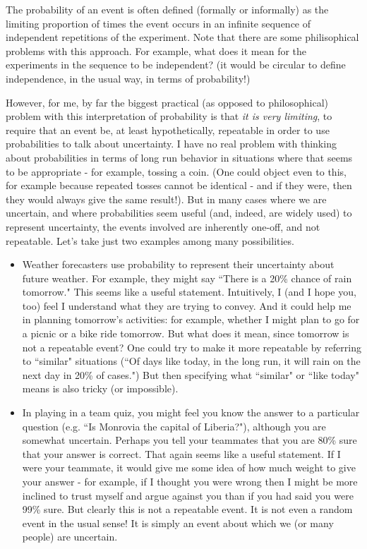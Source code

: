 \documentclass{article}[11pt]
\begin{document}
The probability of an event is often defined (formally or informally)
as the limiting proportion of times the event occurs in an infinite
sequence of independent repetitions of the experiment. Note that there are some philisophical problems with this approach. For example, what does it mean for the experiments in the sequence to be
  independent? (it would be circular to define independence, in the
  usual way, in terms of probability!)

However, for me, by far the biggest practical (as opposed to philosophical) problem with
this interpretation of probability is that {\it it is very limiting}, to require that an event be, at least  hypothetically, repeatable in order to use probabilities to talk about uncertainty. I have no
real problem with thinking about probabilities
in terms of long run behavior in situations where that seems to be appropriate - for example, tossing a coin. (One could object even to this, for example because repeated tosses cannot be identical - and if they were, then they would always give the same result!). But in many cases where we are uncertain, and where probabilities seem useful (and, indeed, are widely used) to represent uncertainty, the events involved are inherently one-off, and not repeatable.
Let's take just two examples among many possibilities.
\begin{itemize}
\item Weather forecasters use probability to represent their uncertainty about future weather. For example, they might say ``There is a 20\% chance of rain tomorrow." This seems like a useful statement. Intuitively, I (and I hope you, too) feel I understand what they are trying to convey.  And it could help me in planning
tomorrow's activities:  for example, whether
I might plan to go for a picnic or a bike ride tomorrow. But what does it mean, since tomorrow
is not a repeatable event? One could try to 
make it more repeatable by referring to  ``similar" situations (``Of days like today, in the long run, it will rain on the next day in 20\% of cases.") But then specifying what ``similar" or ``like today" means is also tricky (or impossible).
\item In playing in a team quiz, you might feel you know the answer to a particular question (e.g. ``Is Monrovia the capital of Liberia?"), although you
are somewhat uncertain. Perhaps you tell your teammates that you are 80\% sure that your answer is correct. That again seems like a useful statement. If I were your teammate, it would give me some idea of how much weight to give your
answer - for example, if I thought you were wrong then I might be more inclined to trust myself and argue against you than if you had said you were 99\% sure. But clearly this is not a repeatable event. It is not even a random event in the usual sense! It is simply an event about which we (or many people) are uncertain.
\end{itemize}
\end{document}
